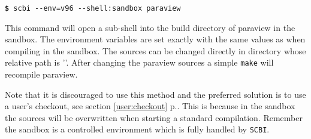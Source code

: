 \documentclass[a4paper,12pt,twoside]{article}
\newcommand{\code}[1]{\texttt{#1}}
\newcommand{\seeref}[1]{see section \ref{#1} p.\pageref{#1}}
\newcommand{\file}[1]{'{\path{#1}}'}
\newcommand{\cmd}[1]{\tabto{1cm}\hspace{0.5cm}\texttt{\textbf{\$} #1}}
\newcommand{\ddash}{-{}-}
\begin{document}
\cmd{scbi \ddash{}env=v96 \ddash{}shell:sandbox paraview}

This command will open a sub-shell into the build directory of paraview in the sandbox. The environment variables are set exactly with the same values as when compiling in the sandbox. The sources can be changed directly in directory whose relative path is \file{../src}. After changing the paraview sources a simple \code{make} will recompile paraview.

Note that it is discouraged to use this method and the preferred solution is to use a user's checkout, \seeref{user:checkout}. This is because in the sandbox the sources will be overwritten when starting a standard compilation. Remember the sandbox is a controlled environment which is fully handled by \code{SCBI}.

\printindex

\end{document}
